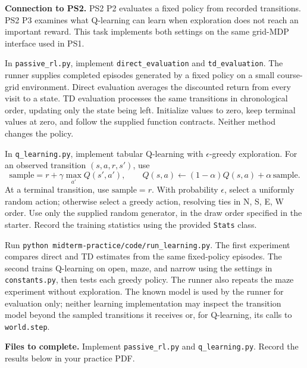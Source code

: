 \documentclass[11pt]{article}
\begin{document}
\textbf{Connection to PS2.} PS2 P2 evaluates a fixed policy from recorded
transitions. PS2 P3 examines what Q-learning can learn when exploration
does not reach an important reward. This task implements both settings
on the same grid-MDP interface used in PS1.

In \texttt{passive\_rl.py}, implement \texttt{direct\_evaluation} and
\texttt{td\_evaluation}. The runner supplies completed episodes generated
by a fixed policy on a small course-grid environment. Direct evaluation
averages the discounted return from every visit to a state. TD evaluation
processes the same transitions in chronological order, updating only the
state being left. Initialize values to zero, keep terminal values at zero,
and follow the supplied function contracts. Neither method changes the policy.

In \texttt{q\_learning.py}, implement tabular Q-learning with
$\epsilon$-greedy exploration. For an observed transition $(s,a,r,s')$,
use
\[
\text{sample}=r+\gamma\max_{a'}Q(s',a'),\qquad
Q(s,a)\leftarrow(1-\alpha)Q(s,a)+\alpha\,\text{sample}.
\]
At a terminal transition, use $\text{sample}=r$. With probability
$\epsilon$, select a uniformly random action; otherwise select a greedy
action, resolving ties in N, S, E, W order. Use only the supplied random
generator, in the draw order specified in the starter. Record the training
statistics using the provided \texttt{Stats} class.

Run \texttt{python midterm-practice/code/run\_learning.py}. The first experiment
compares direct and TD estimates from the same fixed-policy episodes.
The second trains Q-learning on open, maze, and narrow using the settings
in \texttt{constants.py}, then tests each greedy policy. The runner also
repeats the maze experiment without exploration. The known model is used
by the runner for evaluation only; neither learning implementation may
inspect the transition model beyond the sampled transitions it receives
or, for Q-learning, its calls to \texttt{world.step}.

\textbf{Files to complete.} Implement \texttt{passive\_rl.py} and
\texttt{q\_learning.py}. Record the results below in your practice PDF.
\end{document}
